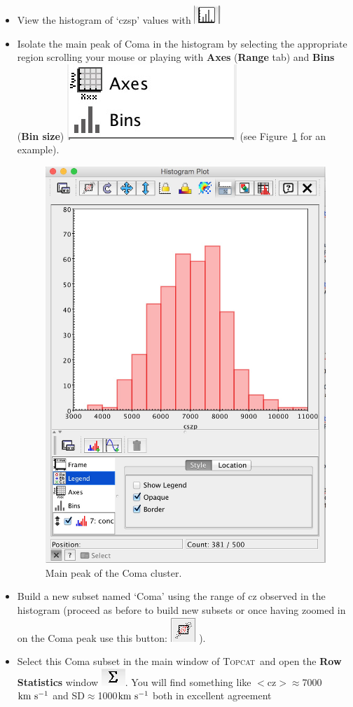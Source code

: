 \documentclass [a4paper, 12pt]{article}
\def\kms{\rm km\ s^{-1}}
\newcommand{\topcat}{{\textsc{Topcat}}}
\begin{document}
\begin{itemize}
\item View the histogram of `czsp' values with  \includegraphics[width=0.06  
\textwidth]{../images/topcat_button_histogram.jpg}
\item Isolate the main peak of Coma in the histogram by selecting the 
appropriate region scrolling your mouse or playing with \textbf{Axes} 
(\textbf{Range} tab) and \textbf{Bins} (\textbf{Bin size})  
\includegraphics[width=0.1  \textwidth]{../images/topcat_set_axes-bins.jpg} 
(see Figure~\ref{fig:comapeak} for an example).
\begin{figure}[H]
\center
\includegraphics[width=0.33  \textwidth]{../images/topcat_coma-velo-peak.jpg}
\caption{Main peak of the Coma cluster.}
\label{fig:comapeak}
\end{figure}
\item Build a new subset named `Coma' using the range of cz observed in the 
histogram (proceed as before to build new subsets or once having zoomed in on 
the Coma peak use this button: \includegraphics[width=0.03 
\textwidth]{../images/topcat_button_selection-plot.png} ).
\item Select this Coma subset in the main window of \topcat\ and open the 
\textbf{Row Statistics} window  \includegraphics[width=0.04  
\textwidth]{../images/topcat_button_stats.jpg}. You will find something like 
$<$cz$>\approx$7000$\kms$ and SD$\approx$1000$\kms$ both in excellent agreement 

\end{itemize}
\end{document}
